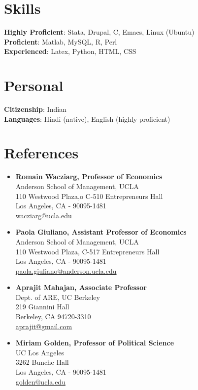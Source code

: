 \documentclass[11pt]{article}
\begin{document}
\section{Skills}
\label{sec-6}
\textbf{Highly Proficient}: Stata, Drupal, C, Emacs, Linux (Ubuntu) \\
\textbf{Proficient}: Matlab, MySQL, R, Perl \\
\textbf{Experienced}: Latex, Python, HTML, CSS \\

\section{Personal}
\label{sec-7}
\textbf{Citizenship}: Indian \\
\textbf{Languages}: Hindi (native), English (highly proficient)\\
\section{References}
\label{sec-8}
\vspace{-0.2in}
\begin{multicols}{2}
\begin{itemize}
\item \textbf{Romain Wacziarg, Professor of Economics} \\
  Anderson School of Management, UCLA \\
  110 Westwood Plaza,o C-510 Entrepreneurs Hall\\
  Los Angeles, CA - 90095-1481\\
  \href{mailto:wacziarg@ucla.edu}{wacziarg@ucla.edu}\\
\item \textbf{Paola Giuliano, Assistant Professor of Economics} \\
  Anderson School of Management, UCLA \\
  110 Westwood Plaza, C-517 Entrepreneurs Hall\\
  Los Angeles, CA - 90095-1481\\
  \href{mailto:paola.giuliano@anderson.ucla.edu}{paola.giuliano@anderson.ucla.edu}\\
\item \textbf{Aprajit Mahajan, Associate Professor} \\
  Dept. of ARE, UC Berkeley \\
  219 Giannini Hall\\
  Berkeley, CA 94720-3310\\
  \href{mailto:aprajit@gmail.com}{aprajit@gmail.com}\\
\item \textbf{Miriam Golden, Professor of Political Science}\\
  UC Los Angeles \\
  3262 Bunche Hall\\
  Los Angeles, CA - 90095-1481\\
  \href{mailto:golden@ucla.edu}{golden@ucla.edu}
\end{itemize}
\end{multicols}
\end{document}

